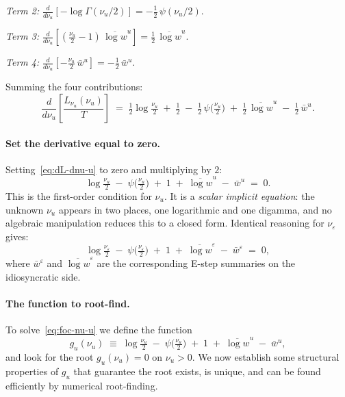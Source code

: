 \documentclass[11pt, a4paper, oneside]{article}
\begin{document}
\emph{Term 2:} $\frac{d}{d\nu_u}\!\left[-\log\Gamma(\nu_u/2)\right] = -\tfrac{1}{2}\,\psi(\nu_u/2)$.

\emph{Term 3:} $\frac{d}{d\nu_u}\!\left[(\tfrac{\nu_u}{2}-1)\,\overline{\log w}^u\right] = \tfrac{1}{2}\,\overline{\log w}^u$.

\emph{Term 4:} $\frac{d}{d\nu_u}\!\left[-\tfrac{\nu_u}{2}\,\bar{w}^u\right] = -\tfrac{1}{2}\,\bar{w}^u$.

Summing the four contributions:
\begin{equation}
\frac{d}{d\nu_u}\!\left[\frac{L_{\nu_u}(\nu_u)}{T}\right]
\;=\; \tfrac{1}{2}\log\!\tfrac{\nu_u}{2} \;+\; \tfrac{1}{2}
\;-\; \tfrac{1}{2}\,\psi\!\big(\tfrac{\nu_u}{2}\big)
\;+\; \tfrac{1}{2}\,\overline{\log w}^u
\;-\; \tfrac{1}{2}\,\bar{w}^u.
\label{eq:dL-dnu-u}
\end{equation}

\paragraph{Set the derivative equal to zero.}
Setting~\eqref{eq:dL-dnu-u} to zero and multiplying by $2$:
\begin{equation}
\boxed{\;\;
\log\!\tfrac{\nu_u}{2} \;-\; \psi\!\big(\tfrac{\nu_u}{2}\big) \;+\; 1 \;+\; \overline{\log w}^u \;-\; \bar{w}^u \;=\; 0.
\;\;}
\label{eq:foc-nu-u}
\end{equation}
This is the first-order condition for $\nu_u$. It is a \emph{scalar
implicit equation}: the unknown $\nu_u$ appears in two places, one
logarithmic and one digamma, and no algebraic manipulation reduces
this to a closed form. Identical reasoning for $\nu_\varepsilon$ gives:
\begin{equation}
\log\!\tfrac{\nu_\varepsilon}{2} \;-\; \psi\!\big(\tfrac{\nu_\varepsilon}{2}\big) \;+\; 1 \;+\; \overline{\log w}^\varepsilon \;-\; \bar{w}^\varepsilon \;=\; 0,
\label{eq:foc-nu-eps}
\end{equation}
where $\bar{w}^\varepsilon$ and $\overline{\log w}^\varepsilon$ are the
corresponding E-step summaries on the idiosyncratic side.

\paragraph{The function to root-find.}
To solve~\eqref{eq:foc-nu-u} we define the function
\begin{equation}
g_u(\nu_u) \;\equiv\; \log\!\tfrac{\nu_u}{2} \;-\; \psi\!\big(\tfrac{\nu_u}{2}\big) \;+\; 1 \;+\; \overline{\log w}^u \;-\; \bar{w}^u,
\label{eq:g-nu-u}
\end{equation}
and look for the root $g_u(\nu_u) = 0$ on $\nu_u > 0$. We now establish
some structural properties of $g_u$ that guarantee the root exists,
is unique, and can be found efficiently by numerical root-finding.
\end{document}
